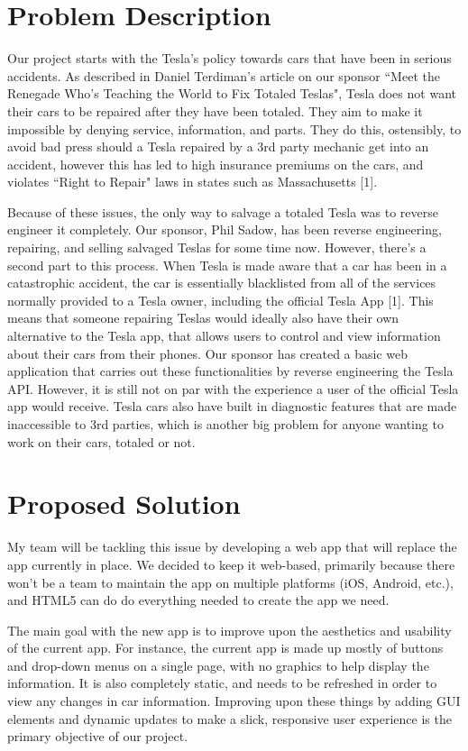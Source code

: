 \documentclass[onecolumn, draftclsnofoot,10pt, compsoc]{IEEEtran}
\begin{document}
\section{Problem Description}
Our project starts with the Tesla's policy towards cars that have been in serious accidents. As described in Daniel Terdiman's article on our sponsor ``Meet the 
Renegade Who's Teaching the World to Fix Totaled Teslas", Tesla does not want their cars to be repaired after they have been totaled. They aim to make it
impossible by denying service, information, and parts. They do this, ostensibly, to avoid bad press should a Tesla repaired by a 3rd party mechanic get into an accident,
however this has led to high insurance premiums on the cars, and violates ``Right to Repair" laws in states such as Massachusetts [1].

Because of these issues, the only way to salvage a totaled Tesla was to reverse engineer it completely. Our sponsor, Phil Sadow, has been reverse engineering, repairing,
and selling salvaged Teslas for some time now. However, there's a second part to this process. When Tesla is made aware that a car has been in a 
catastrophic accident, the car is essentially blacklisted from all of the services normally provided to a Tesla owner, including the official Tesla App [1]. 
This means that someone repairing 
Teslas would ideally also have their own alternative to the Tesla app, that allows users to control and view information about their cars from their phones. Our sponsor has created a basic
web application that carries out these functionalities by reverse engineering the Tesla API. However, it is still not on par with the experience a user of the 
official Tesla app would receive. Tesla cars also have built in diagnostic features that are made inaccessible to 3rd parties, which is another big problem 
for anyone wanting to work on their cars, totaled or not.

\section{Proposed Solution}
My team will be tackling this issue by developing a web app that will replace the app currently in place. We decided to keep it web-based, primarily because there 
won't be a team to maintain the app on multiple platforms (iOS, Android, etc.), and HTML5 can do do everything needed to create the app we need. 

The main goal with the new app is to improve upon the aesthetics and usability of the current app.
For instance, the current app is made up mostly of buttons and drop-down menus on a single page, with no graphics to help display the information. It is also 
completely static, and needs to be refreshed in order to view any changes in car information. Improving upon these things by adding GUI elements and dynamic updates
to make a slick, responsive user experience is the primary objective of our project. 
\end{document}
